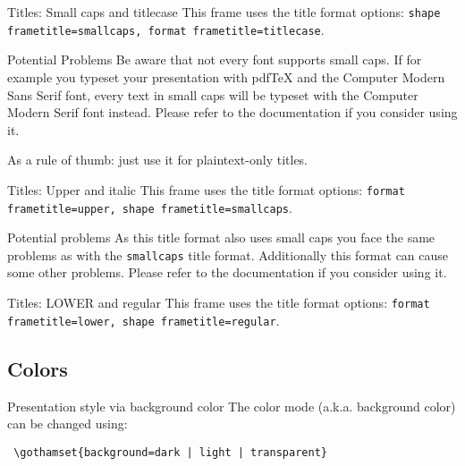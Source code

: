 \documentclass[aspectratio=169]{beamer}
\begin{document}
	{ 
	\begin{frame}{Titles: Small caps and titlecase}
		This frame uses the title format options: \texttt{shape frametitle=smallcaps, format frametitle=titlecase}.

		\begin{alertblock}{Potential Problems}
			Be aware that not every font supports small caps. 
			If for example you typeset your presentation with pdfTeX and the Computer Modern Sans Serif font, every text in small caps will be typeset with the Computer Modern Serif font instead.
			Please refer to the documentation if you consider using it.

			As a rule of thumb: just use it for plaintext-only titles.
		\end{alertblock}
	\end{frame}
	}

	{ 
	\begin{frame}{Titles: Upper and italic}
		This frame uses the title format options: \texttt{format frametitle=upper, shape frametitle=smallcaps}.

		\begin{alertblock}{Potential problems}
			As this title format also uses small caps you face the same problems as with the \texttt{smallcaps} title format. 
			Additionally this format can cause some other problems. 
			Please refer to the documentation if you consider using it.
		\end{alertblock}
	\end{frame}
	}

	{ 
	\begin{frame}{Titles: LOWER and regular}
		This frame uses the title format options: \texttt{format frametitle=lower, shape frametitle=regular}.
	\end{frame}
	}


\subsection{Colors}

	{ 
	\begin{frame}[fragile]{Presentation style via background color}
		The color mode (a.k.a. background color) can be changed using:
		\begin{verbatim} \gothamset{background=dark | light | transparent} \end{verbatim}
	\end{frame}
	}
\end{document}
